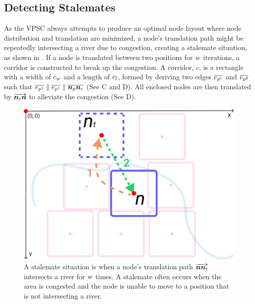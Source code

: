 \subsection{Detecting Stalemates}

As the VPSC always attempts to produce an optimal node layout where node distribution and translation are minimized, a node's translation path might be repeatedly intersecting a river due to congestion, creating a stalemate situation, as shown in . If a node is translated between two positions for $ w $ iterations, a corridor is constructed to break up the congestion. A corridor, $ c $, is a rectangle with a width of $ c_w $ and a length of $ c_l $, formed by deriving two edges $ \protect\overline{e_{p^1}} $ and $ \protect\overline{e_{p^2}} $ such that $ \protect\overline{e_{p^1}} \parallel \protect\overline{e_{p^1}} \parallel \protect\overline{\bm{n}_{p}\bm{n}_c} $ (See C and D). All enclosed nodes are then translated by $ \protect\overrightarrow{\bm{n}_t\bm{n}} $ to alleviate the congestion (See D).

{
\begin{figure}[tb!]
    \centering
    \includegraphics[width=\columnwidth]{figure/stalemate.png}
    \caption{A stalemate situation is when a node's translation path $ \protect\overrightarrow{\bm{n}\bm{n}_t} $ intersects a river for $ w $ times. A stalemate often occurs when the area is congested and the node is unable to move to a position that is not intersecting a river.}
    \label{fig:stalemate}
\end{figure}
}

